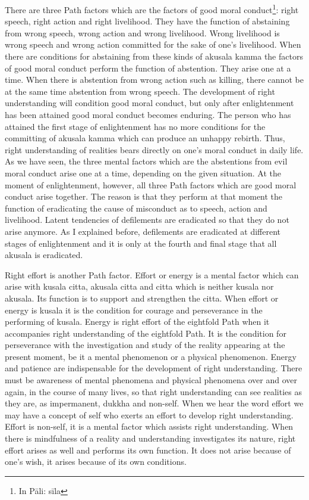 \documentclass{book}
\begin{document}
There are three Path factors which are the factors of good moral
conduct\footnote{In Pāli: sīla}: right speech, right action and right
livelihood. They have the function of abstaining from wrong speech,
wrong action and wrong livelihood. Wrong livelihood is wrong speech and
wrong action committed for the sake of one's livelihood. When there are
conditions for abstaining from these kinds of akusala kamma the factors
of good moral conduct perform the function of abstention. They arise one
at a time. When there is abstention from wrong action such as killing,
there cannot be at the same time abstention from wrong speech. The
development of right understanding will condition good moral conduct,
but only after enlightenment has been attained good moral conduct
becomes enduring. The person who has attained the first stage of
enlightenment has no more conditions for the committing of akusala kamma
which can produce an unhappy rebirth. Thus, right understanding of
realities bears directly on one's moral conduct in daily life. As we
have seen, the three mental factors which are the abstentions from evil
moral conduct arise one at a time, depending on the given situation. At
the moment of enlightenment, however, all three Path factors which are
good moral conduct arise together. The reason is that they perform at
that moment the function of eradicating the cause of misconduct as to
speech, action and livelihood. Latent tendencies of defilements are
eradicated so that they do not arise anymore. As I explained before,
defile­ments are eradicated at different stages of enlightenment and it
is only at the fourth and final stage that all akusala is eradicated.

Right effort is another Path factor. Effort or energy is a mental factor
which can arise with kusala citta, akusala citta and citta which is
neither kusala nor akusala. Its function is to support and strengthen
the citta. When effort or energy is kusala it is the condition for
courage and perseverance in the performing of kusala. Energy is right
effort of the eightfold Path when it accompanies right understanding of
the eightfold Path. It is the condition for perseverance with the
investigation and study of the reality appearing at the present moment,
be it a mental phenomenon or a physical phenomenon. Energy and patience
are indispensable for the development of right understanding. There must
be awareness of mental phenomena and physical phenomena over and over
again, in the course of many lives, so that right understanding can see
realities as they are, as impermanent, dukkha and non-self. When we hear
the word effort we may have a concept of self who exerts an effort to
develop right understanding. Effort is non-self, it is a mental factor
which assists right understanding. When there is mindful­ness of a
reality and understanding investigates its nature, right effort arises    as well and performs its own function. It does not arise because of    one's wish, it arises because of its own conditions.
\end{document}
